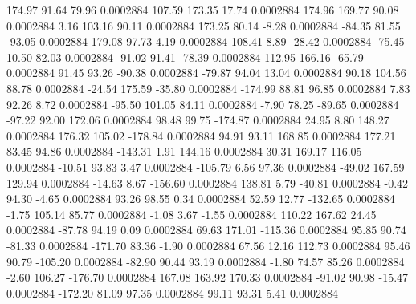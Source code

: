       174.97       91.64       79.96     0.0002884
      107.59      173.35       17.74     0.0002884
      174.96      169.77       90.08     0.0002884
        3.16      103.16       90.11     0.0002884
      173.25       80.14       -8.28     0.0002884
      -84.35       81.55      -93.05     0.0002884
      179.08       97.73        4.19     0.0002884
      108.41        8.89      -28.42     0.0002884
      -75.45       10.50       82.03     0.0002884
      -91.02       91.41      -78.39     0.0002884
      112.95      166.16      -65.79     0.0002884
       91.45       93.26      -90.38     0.0002884
      -79.87       94.04       13.04     0.0002884
       90.18      104.56       88.78     0.0002884
      -24.54      175.59      -35.80     0.0002884
     -174.99       88.81       96.85     0.0002884
        7.83       92.26        8.72     0.0002884
      -95.50      101.05       84.11     0.0002884
       -7.90       78.25      -89.65     0.0002884
      -97.22       92.00      172.06     0.0002884
       98.48       99.75     -174.87     0.0002884
       24.95        8.80      148.27     0.0002884
      176.32      105.02     -178.84     0.0002884
       94.91       93.11      168.85     0.0002884
      177.21       83.45       94.86     0.0002884
     -143.31        1.91      144.16     0.0002884
       30.31      169.17      116.05     0.0002884
      -10.51       93.83        3.47     0.0002884
     -105.79        6.56       97.36     0.0002884
      -49.02      167.59      129.94     0.0002884
      -14.63        8.67     -156.60     0.0002884
      138.81        5.79      -40.81     0.0002884
       -0.42       94.30       -4.65     0.0002884
       93.26       98.55        0.34     0.0002884
       52.59       12.77     -132.65     0.0002884
       -1.75      105.14       85.77     0.0002884
       -1.08        3.67       -1.55     0.0002884
      110.22      167.62       24.45     0.0002884
      -87.78       94.19        0.09     0.0002884
       69.63      171.01     -115.36     0.0002884
       95.85       90.74      -81.33     0.0002884
     -171.70       83.36       -1.90     0.0002884
       67.56       12.16      112.73     0.0002884
       95.46       90.79     -105.20     0.0002884
      -82.90       90.44       93.19     0.0002884
       -1.80       74.57       85.26     0.0002884
       -2.60      106.27     -176.70     0.0002884
      167.08      163.92      170.33     0.0002884
      -91.02       90.98      -15.47     0.0002884
     -172.20       81.09       97.35     0.0002884
       99.11       93.31        5.41     0.0002884
